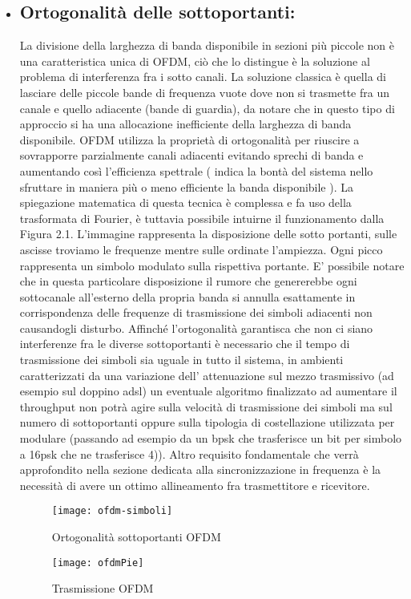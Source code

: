 \begin{itemize}
	 \item \subsection{Ortogonalità delle sottoportanti: } La divisione della larghezza di banda disponibile in sezioni più piccole non è una caratteristica unica di OFDM, ciò che lo distingue è la soluzione al problema di interferenza fra i sotto canali. La soluzione classica è quella di lasciare delle piccole bande di frequenza vuote dove non si trasmette fra un canale e quello adiacente (bande di guardia), da notare che in questo tipo di approccio si ha una allocazione inefficiente della larghezza di banda disponibile. OFDM utilizza la proprietà di ortogonalità per riuscire a sovrapporre parzialmente canali adiacenti evitando sprechi di banda e aumentando così l'efficienza spettrale ( indica la bontà del sistema nello sfruttare in maniera più o meno efficiente la banda disponibile \cite{efficienzaSpettrale}).
	 La spiegazione matematica di questa tecnica è complessa e fa uso della trasformata di Fourier, è tuttavia possibile intuirne il funzionamento dalla Figura 2.1. L'immagine rappresenta la disposizione delle sotto portanti, sulle ascisse troviamo le frequenze mentre sulle ordinate l'ampiezza. Ogni picco rappresenta un simbolo modulato sulla rispettiva portante. E' possibile notare che in questa particolare disposizione il rumore che genererebbe ogni sottocanale all'esterno della propria banda si annulla esattamente in corrispondenza delle frequenze di trasmissione dei simboli adiacenti non causandogli disturbo. Affinché l'ortogonalità garantisca che non ci siano interferenze fra le diverse sottoportanti è necessario che il tempo di trasmissione dei simboli sia uguale in tutto il sistema, in ambienti caratterizzati da una variazione dell' attenuazione sul mezzo trasmissivo (ad esempio sul doppino adsl) un eventuale algoritmo finalizzato ad aumentare il throughput non potrà agire sulla velocità di trasmissione dei simboli ma sul numero di sottoportanti oppure sulla tipologia di costellazione utilizzata per modulare (passando ad esempio da un bpsk che trasferisce un bit per simbolo a 16psk che ne trasferisce 4)). Altro requisito fondamentale che verrà approfondito nella sezione dedicata alla sincronizzazione in frequenza è la necessità di avere un ottimo allineamento fra trasmettitore e ricevitore.
	 
	 \begin{figure}[h]
	 	\centering
	 	\begin{minipage}[b]{.50\columnwidth}
	 		\texttt{[image: ofdm-simboli]}
	 		\caption{Ortogonalità sottoportanti OFDM \cite{ofdm-simboli}}\label{fig:1}
	 	\end{minipage}\hfill
	 	\begin{minipage}[b]{.50\columnwidth}
	 		\texttt{[image: ofdmPie]}
	 		\caption{Trasmissione OFDM }\label{fig:1}
	 	\end{minipage}\hfill
	 \end{figure}


\end{itemize}
